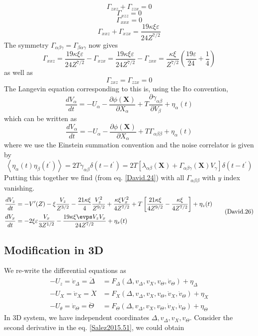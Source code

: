 \documentclass[books,12pt]{elegantpaper}
\newcommand{\ssc}{\subsection}
\newcommand{\pder}[2][]{\frac{\partial#1}{\partial#2}}
\newcommand{\beq}{\begin{equation}}
\newcommand{\eeq}{\end{equation}}
\newcommand{\bgn}{\begin{align}}
\newcommand{\tlag}[1]{\tag{#1} \label{#1}}
\newcommand{\veps}{\varepsilon}
\newcommand{\llang}{\left\langle}
\newcommand{\rrang}{\right\rangle}
\begin{document}
\beq \Gamma_{zxz} + \Gamma_{zzx} = 0 \tlag{David.17} \eeq
\beq \Gamma_{xzz} = 0 \tlag{David.18} \eeq
\beq \Gamma_{xxx} = 0 \tlag{David.19} \eeq
\beq \Gamma_{xxz} + \Gamma_{xzx} = \frac{19 \kappa \xi \veps}{24 Z^{7/2}} \tlag{David.20} \eeq
The symmetry $\Gamma_{\alpha\beta\gamma} = \Gamma_{\beta\alpha\gamma}$ now gives
\beq \Gamma_{xxz} = \frac{19 \kappa \xi \veps}{24 Z^{7/2}} - \Gamma_{xzx} = \frac{19 \kappa \xi \veps}{24 Z^{7/2}} - \Gamma_{zxx} = \frac{\kappa\xi}{Z^{7/2}} \left( \frac{19\veps}{24} + \frac{1}{4} \right) \tlag{David.21} \eeq
as well as
\beq \Gamma_{zxz} = \Gamma_{zzx} = 0 \tlag{David.22} \eeq
The Langevin equation corresponding to this is, using the Ito convention,
\beq \frac{dV_\alpha}{dt} = -U_\alpha - \pder[\phi(\mathbf{X})]{X_\alpha} + T \pder[\gamma_{\alpha\beta}]{V_\beta} + \eta_\alpha(t) \tlag{David.23} \eeq
which can be written as
\beq \frac{dV_\alpha}{dt} = -U_\alpha - \pder[\phi(\mathbf{X})]{X_\alpha} + T \Gamma_{\alpha\beta\beta} + \eta_\alpha(t) \tlag{David.24} \eeq
where we use the Einstein summation convention and the noise correlator is given by
\beq \llang \eta_\alpha (t) \eta_\beta(t^\prime) \rrang = 2T \gamma_{\alpha \beta} \delta(t-t^\prime) = 2T \left[ \lambda_{\alpha\beta}(\mathbf{X}) + \Gamma_{\alpha\beta\gamma}(\mathbf{X}) V_\gamma \right] \delta(t-t^\prime) \tlag{David.25} \eeq
Putting this together we find (from eq. \ref{David.24}) with all $\Gamma_{\alpha\beta\beta}$ with $y$ index vanishing.
\beq \bgn
\frac{dV_z}{dt} &= -V^\prime(Z) - \xi \frac{V_z}{Z^{3/2}} - \frac{21\kappa\xi}{4}\frac{V_z^2}{Z^{9/2}} + \frac{\kappa \xi V_x^2}{4 Z^{7/2}} + T \left[ \frac{21 \kappa \xi}{4 Z^{9/2}} - \frac{\kappa \xi}{4 Z^{7/2}} \right] + \eta_z(t) \\
\frac{dV_x}{dt} &= -2\xi\veps \frac{V_x}{3 Z^{1/2}} - \frac{19 \kappa \xi \evps V_z V_x}{24 Z^{7/2}} + \eta_x(t) 
\end{align} \tlag{David.26} \eeq


\ssc{Modification in 3D}
We re-write the differential equations as 
$$ \bgn
-U_z = \dot{v}_\Delta = \ddot\Delta &= F_\Delta (\Delta,v_\Delta,v_X,v_\Theta,\dot{v}_\Theta) + \eta_\Delta \\ %
-U_X = \dot{v}_X = \ddot{X} &= F_X (\Delta,v_\Delta,v_X,v_\Theta,\dot{v}_X,\dot{v}_\Theta) + \eta_X \\ %
-U_\theta = \dot{v}_\Theta = \ddot\Theta &= F_\Theta (\Delta,v_\Delta,v_X,v_\Theta,\dot{v}_X,\dot{v}_\Theta) + \eta_\Theta %
\end{align} $$
In 3D system, we have independent coordinates $\Delta,v_\Delta,v_{X},v_\Theta$. Consider the second derivative in the eq. \ref{Salez2015.51}, we could obtain
\end{document}
